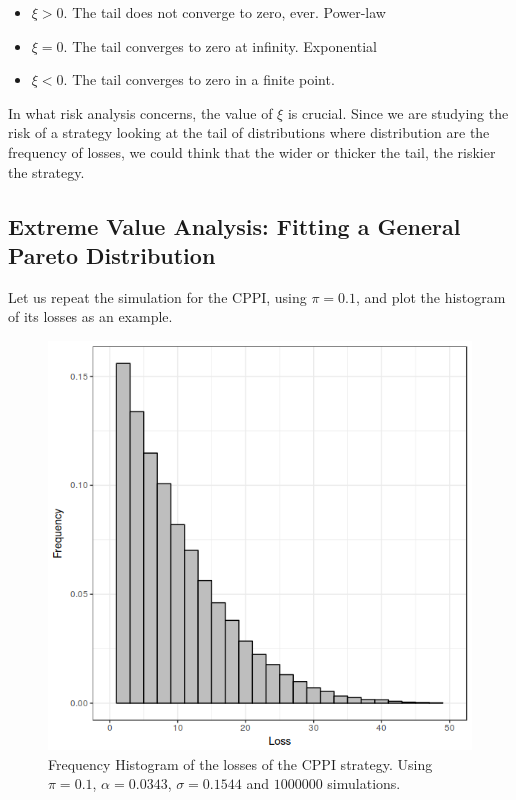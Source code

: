 \begin{itemize}
    \item $\xi > 0$. The tail does not converge to zero, ever. Power-law
    \item $\xi = 0$. The tail converges to zero at infinity. Exponential
    \item $\xi < 0$. The tail converges to zero in a finite point.
\end{itemize}

In what risk analysis concerns, the value of $\xi$ is crucial. Since we are studying the risk of a strategy looking at the tail of distributions where distribution are the frequency of losses, we could think that the wider or thicker the tail, the riskier the strategy. 

\subsection{Extreme Value Analysis: Fitting a General Pareto Distribution}

Let us repeat the simulation for the CPPI, using $\pi = 0.1$, and plot the histogram of its losses as an example.

\begin{figure}[H]
    \centering
    \includegraphics[scale=0.75]{images/cppi-losses-hist.png}
    \caption{Frequency Histogram of the losses of the CPPI strategy. Using $\pi = 0.1$, $\alpha = 0.0343$, $\sigma = 0.1544$ and $1000000$ simulations.}
    \label{fig:cppi-losses-histogram}
\end{figure}

